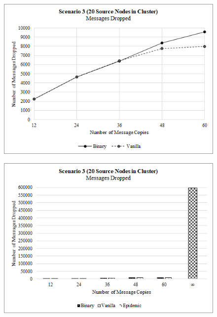\documentclass{article}
\begin{document}
\begin{figure}[h!]
\centering
\begin{minipage}[t]{.5\textwidth}
  \centering
  \includegraphics[width=.98\linewidth]{Results/Graphs/MessagesDropped/S3_MessagesDropped_SprayAndWaitComparison.png}
  \label{fig:test1}
\end{minipage}%
\begin{minipage}[t]{.5\textwidth}
  \centering
  \includegraphics[width=.98\linewidth]{Results/Graphs/MessagesDropped/S3_MessagesDropped_AllComparison.png}
  \label{fig:test2}
\end{minipage}

\end{figure}
\end{document}
